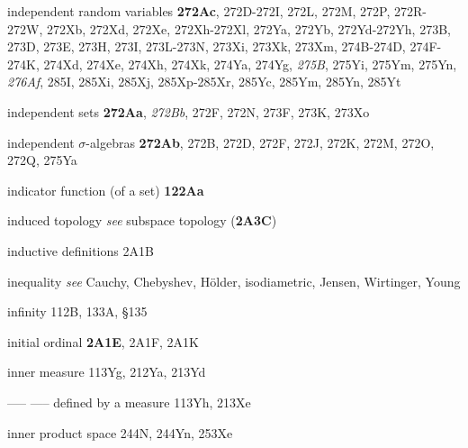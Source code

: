 independent random variables {\bf 272Ac},
272D-272I, 
272L, 272M, 272P, 272R-272W, 
272Xb, 272Xd, 272Xe, 272Xh-272Xl, 
272Ya, 272Yb, 272Yd-272Yh, 
273B, 273D, 273E, 273H, 273I,
273L-273N, 
273Xi, 273Xk, 273Xm, 274B-274D, 
274F-274K, 
274Xd, 274Xe, 274Xh, 274Xk, 274Ya, 274Yg,
{\it 275B}, 275Yi, 275Ym, 275Yn, {\it 276Af}, 285I, 285Xi, 285Xj,
285Xp-285Xr, 
285Yc, 285Ym, 285Yn, 285Yt



independent sets {\bf 272Aa}, {\it 272Bb}, 272F, 272N, 273F,
273K, 273Xo




independent $\sigma$-algebras {\bf 272Ab}, 272B, 272D, 272F, 272J,
272K, 272M, 272O, 272Q, 275Ya





indicator function (of a set) {\bf 122Aa}









induced topology {\it see} subspace topology ({\bf 2A3C})


inductive definitions 2A1B








inequality {\it see} Cauchy, Chebyshev, H\"older, isodiametric, Jensen, Wirtinger, Young














infinity 112B, 133A, \S135





initial ordinal {\bf 2A1E}, 2A1F, 2A1K












inner measure 113Yg,
  212Ya, 213Yd
  

----- ----- defined by a measure 113Yh,
  213Xe 


inner product space 244N, 244Yn, 253Xe




